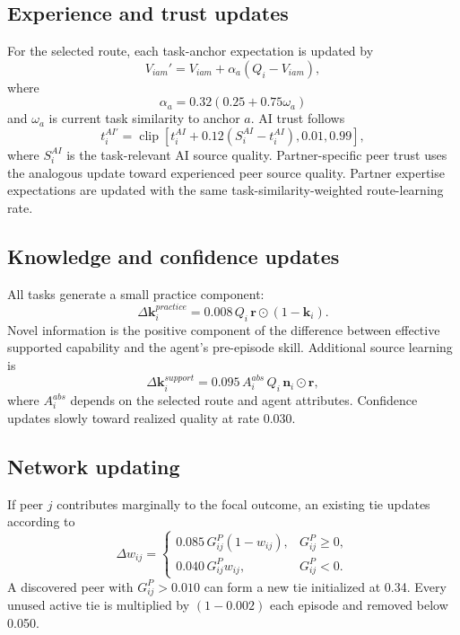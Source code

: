 \documentclass[11pt]{article}
\newcommand{\clip}{\operatorname{clip}}
\begin{document}
\subsection{Experience and trust updates}
For the selected route, each task-anchor expectation is updated by
\begin{equation}
V_{iam}'=V_{iam}+\alpha_a(Q_i-V_{iam}),
\end{equation}
where
\begin{equation}
\alpha_a=0.32(0.25+0.75\omega_a)
\end{equation}
and $\omega_a$ is current task similarity to anchor $a$. AI trust follows
\begin{equation}
t_i^{AI'}=\clip\left[t_i^{AI}+0.12(S_i^{AI}-t_i^{AI}),0.01,0.99\right],
\end{equation}
where $S_i^{AI}$ is the task-relevant AI source quality. Partner-specific peer trust uses the analogous update toward experienced peer source quality. Partner expertise expectations are updated with the same task-similarity-weighted route-learning rate.

\subsection{Knowledge and confidence updates}
All tasks generate a small practice component:
\begin{equation}
\Delta\mathbf{k}_i^{practice}=0.008\,Q_i\,\mathbf r\odot(1-\mathbf k_i).
\end{equation}
Novel information is the positive component of the difference between effective supported capability and the agent's pre-episode skill. Additional source learning is
\begin{equation}
\Delta\mathbf{k}_i^{support}=0.095\,A_i^{abs}\,Q_i\,\mathbf n_i\odot\mathbf r,
\end{equation}
where $A_i^{abs}$ depends on the selected route and agent attributes. Confidence updates slowly toward realized quality at rate 0.030.

\subsection{Network updating}
If peer $j$ contributes marginally to the focal outcome, an existing tie updates according to
\begin{equation}
\Delta w_{ij}=\begin{cases}
0.085\,G_{ij}^{P}(1-w_{ij}), & G_{ij}^{P}\ge 0,\\
0.040\,G_{ij}^{P}w_{ij}, & G_{ij}^{P}<0.
\end{cases}
\end{equation}
A discovered peer with $G_{ij}^{P}>0.010$ can form a new tie initialized at 0.34. Every unused active tie is multiplied by $(1-0.002)$ each episode and removed below 0.050.
\end{document}

